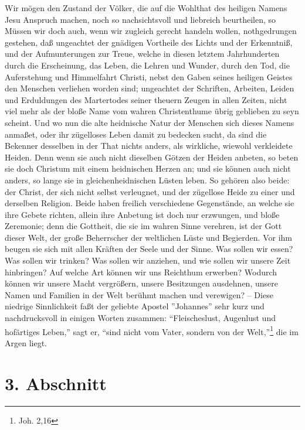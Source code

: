 Wir mögen den Zustand der Völker, die auf die Wohlthat des heiligen Namens Jesu Anspruch machen, noch so nachsichtsvoll und liebreich beurtheilen, so Müssen wir doch auch, wenn wir zugleich gerecht handeln wollen, nothgedrungen gestehen, daß ungeachtet der gnädigen Vortheile des Lichts und der Erkenntniß, und der Aufmunterungen zur Treue, welche in diesen letztem Jahrhunderten durch die Erscheinung, das Leben, die Lehren und Wunder, durch den Tod, die Auferstehung und Himmelfahrt Christi, nebst den Gaben seines heiligen Geistes den Menschen verliehen worden sind; ungeachtet der Schriften, Arbeiten, Leiden und Erduldungen des Martertodes seiner theuern Zeugen in allen Zeiten, nicht viel mehr als der bloße Name vom wahren Christenthume übrig geblieben zu seyn scheint. Und wo nun die alte heidnische Natur der Menschen sich dieses Namens anmaßet, oder ihr zügelloses Leben damit zu bedecken sucht, da sind die Bekenner desselben in der That nichts anders, als wirkliche, wiewohl verkleidete Heiden. Denn wenn sie auch nicht dieselben Götzen der Heiden anbeten, so beten sie doch Christum mit einem heidnischen Herzen an; und sie können auch nicht anders, so lange sie in gleichenheidnischen Lüsten leben. So gehören also beide: der Christ, der sich nicht selbst verleugnet, und der zügellose Heide zu einer und derselben Religion. Beide haben freilich verschiedene Gegenstände, an welche sie ihre Gebete richten, allein ihre Anbetung ist doch nur erzwungen, und bloße Zeremonie; denn die Gottheit, die sie im wahren Sinne verehren, ist der Gott dieser Welt, der große Beherrscher der weltlichen Lüste und Begierden. Vor ihm beugen sie sich mit allen Kräften der Seele und der Sinne. Was sollen wir essen? Was sollen wir trinken? Was sollen wir anziehen, und wie sollen wir unsere Zeit hinbringen? Auf welche Art können wir uns Reichthum erwerben? Wodurch können wir unsere Macht vergrößern, unsere Besitzungen ausdehnen, unsere Namen und Familien in der Welt berühmt machen und verewigen? – Diese niedrige Sinnlichkeit faßt der geliebte Apostel ''Johannes'' sehr kurz und nachdrucksvoll in einigen Worten zusammen: "`Fleischeslust, Augenlust und hofärtiges Leben,"' sagt er, "`sind nicht vom Vater, sondern von der Welt,"'\footnote{Joh. 2,16} die im Argen liegt.

\section{3. Abschnitt}

